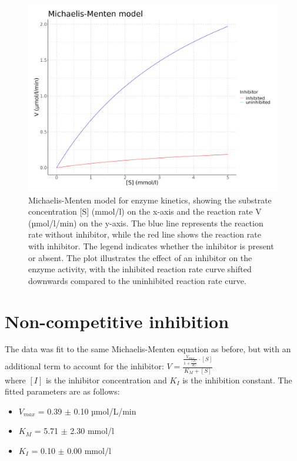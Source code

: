\documentclass{article}
\begin{document}
\begin{figure}[H]
    \centering
    \includegraphics[width=1.0\textwidth, height=0.5\textheight]{plots/model_fit_plot2.png}
    \caption{Michaelis-Menten model for enzyme kinetics, showing the substrate concentration [S] (mmol/l)
        on the x-axis and the reaction rate V (µmol/l/min) on the y-axis. The blue line represents the reaction
        rate without inhibitor, while the red line shows the reaction rate with inhibitor. The legend indicates
        whether the inhibitor is present or absent. The plot illustrates the effect of an inhibitor on the enzyme
        activity, with the inhibited reaction rate curve shifted downwards compared to the uninhibited reaction rate curve.}
    \label{fig:enzyme_kinetics}
\end{figure}

\section{Non-competitive inhibition}

The data was fit to the same Michaelis-Menten equation as before, but with an additional term to account for
the inhibitor: $    V =\displaystyle \frac{\displaystyle \frac{V_{max}}{1 + \frac{[I]}{K_{I}}} \cdot [S]}{K_{M} + [S]}
$\\ where $[I]$ is the inhibitor
concentration and $K_{I}$ is the inhibition constant. The fitted parameters are as follows:
\begin{itemize}
    \item $V_{max}$ = 0.39 $\pm$ 0.10 µmol/L/min
    \item $K_{M}$ = 5.71 $\pm$ 2.30 mmol/l
    \item $K_{I}$ = 0.10 $\pm$ 0.00 mmol/l
\end{itemize}
\end{document}
